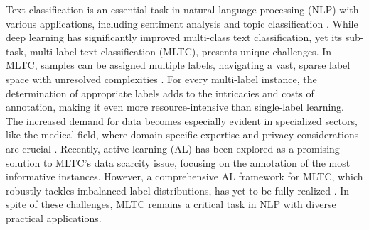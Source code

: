\documentclass[letterpaper]{article} %
\begin{document}
Text classification is an essential task in natural language processing (NLP) with various applications, including sentiment analysis and topic classification \cite{8719904, 9412588}. 
While deep learning has significantly improved multi-class text classification, yet its sub-task, multi-label text classification (MLTC), presents unique challenges. 
In MLTC, samples can be assigned multiple labels, navigating a vast, sparse label space with unresolved complexities \citep{10.1145/3077136.3080834, 8830456}. 
For every multi-label instance, the determination of appropriate labels adds to the intricacies and costs of annotation, making it even more resource-intensive than single-label learning. 
The increased demand for data becomes especially evident in specialized sectors, like the medical field, where domain-specific expertise and privacy considerations are crucial \citep{BUSTOS2020101797}.
Recently, active learning (AL) has been explored as a promising solution to MLTC's data scarcity issue, focusing on the annotation of the most informative instances. 
However, a comprehensive AL framework for MLTC, which robustly tackles imbalanced label distributions, has yet to be fully realized \citep{Cherman2019, 10.1145/3379504}. 
In spite of these challenges, MLTC remains a critical task in NLP with diverse practical applications.
\end{document}
